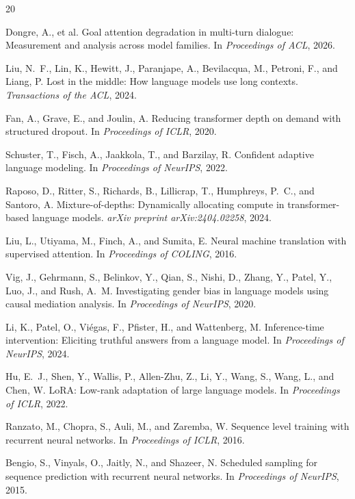 \documentclass[11pt,a4paper]{article}
\begin{document}
\begin{thebibliography}{20}

Dongre, A., et al.
\newblock Goal attention degradation in multi-turn dialogue: Measurement and analysis across model families.
\newblock In \emph{Proceedings of ACL}, 2026.

Liu, N.~F., Lin, K., Hewitt, J., Paranjape, A., Bevilacqua, M., Petroni, F., and Liang, P.
\newblock Lost in the middle: How language models use long contexts.
\newblock \emph{Transactions of the ACL}, 2024.

Fan, A., Grave, E., and Joulin, A.
\newblock Reducing transformer depth on demand with structured dropout.
\newblock In \emph{Proceedings of ICLR}, 2020.

Schuster, T., Fisch, A., Jaakkola, T., and Barzilay, R.
\newblock Confident adaptive language modeling.
\newblock In \emph{Proceedings of NeurIPS}, 2022.

Raposo, D., Ritter, S., Richards, B., Lillicrap, T., Humphreys, P.~C., and Santoro, A.
\newblock Mixture-of-depths: Dynamically allocating compute in transformer-based language models.
\newblock \emph{arXiv preprint arXiv:2404.02258}, 2024.

Liu, L., Utiyama, M., Finch, A., and Sumita, E.
\newblock Neural machine translation with supervised attention.
\newblock In \emph{Proceedings of COLING}, 2016.

Vig, J., Gehrmann, S., Belinkov, Y., Qian, S., Nishi, D., Zhang, Y., Patel, Y., Luo, J., and Rush, A.~M.
\newblock Investigating gender bias in language models using causal mediation analysis.
\newblock In \emph{Proceedings of NeurIPS}, 2020.

Li, K., Patel, O., Vi{\'e}gas, F., Pfister, H., and Wattenberg, M.
\newblock Inference-time intervention: Eliciting truthful answers from a language model.
\newblock In \emph{Proceedings of NeurIPS}, 2024.

Hu, E.~J., Shen, Y., Wallis, P., Allen-Zhu, Z., Li, Y., Wang, S., Wang, L., and Chen, W.
\newblock LoRA: Low-rank adaptation of large language models.
\newblock In \emph{Proceedings of ICLR}, 2022.

Ranzato, M., Chopra, S., Auli, M., and Zaremba, W.
\newblock Sequence level training with recurrent neural networks.
\newblock In \emph{Proceedings of ICLR}, 2016.

Bengio, S., Vinyals, O., Jaitly, N., and Shazeer, N.
\newblock Scheduled sampling for sequence prediction with recurrent neural networks.
\newblock In \emph{Proceedings of NeurIPS}, 2015.

\end{thebibliography}
\end{document}
